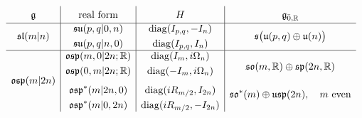 \begin{equation}\label{table::real_forms_classical}
\renewcommand{\arraystretch}{1.4}
\begin{array}{c|c|c|c}
    \gg
    & \text{real form}
    & H
    & \gg_{\bar0,\RR} \\ \hline
    \sl(m\vert n)
    & \begin{gathered}
        \su(p,q\vert0,n)\\
        \su(p,q\vert n,0)
      \end{gathered}
    & \begin{gathered}
        \operatorname{diag}(I_{p,q},-I_n)\\
        \operatorname{diag}(I_{p,q},I_n)
      \end{gathered}
    & \mathfrak{s}\bigl(\mathfrak{u}(p,q)\oplus\mathfrak{u}(n)\bigr)
    \\ \hline
    \osp(m\vert2n)
    & \begin{gathered}
        \osp(m,0\vert2n;\RR)\\
        \osp(0,m\vert2n;\RR)\\[1ex]
        \osp^{\ast}(m\vert2n,0)\\
        \osp^{\ast}(m\vert0,2n)
      \end{gathered}
    & \begin{gathered}
        \operatorname{diag}(I_m,i\Omega_n)\\
        \operatorname{diag}(-I_m,i\Omega_n)\\[1ex]
        \operatorname{diag}(iR_{m/2},I_{2n})\\
        \operatorname{diag}(iR_{m/2},-I_{2n})
      \end{gathered}
    & \begin{gathered}
        \so(m,\RR)\oplus\mathfrak{sp}(2n,\RR)
        \\[3ex]
        \so^{\ast}(m)\oplus\mathfrak{usp}(2n),
        \quad m\text{ even}
      \end{gathered}
\end{array}
\end{equation}


